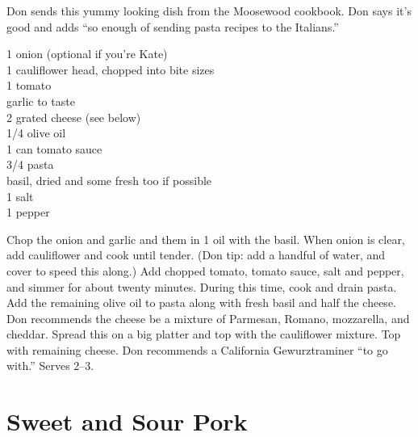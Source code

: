 \begin{open}
  Don sends this yummy looking dish from the Moosewood cookbook. Don
  says it's good and adds ``so enough of sending pasta recipes to the
  Italians.''
\end{open}
\begin{ingredients}
  1 onion (optional if you're Kate)\\
  1 cauliflower head, chopped into bite sizes\\
  1 tomato\\
  garlic to taste\\
  \SI{2}{\cup} grated cheese (see below)\\
  \SI{1/4}{\cup} olive oil\\
  1 can tomato sauce\\
  \SI{3/4}{\pound} pasta\\
  basil, dried and some fresh too if possible\\
  \SI{1}{\teaspoon} salt\\
  \SI{1}{\teaspoon} pepper
\end{ingredients}
Chop the onion and garlic and \saute them in \SI{1}{\teaspoon} oil with the
basil. When onion is clear, add cauliflower and cook until tender. (Don tip: add
a handful of water, and cover to speed this along.) Add chopped tomato, tomato
sauce, salt and pepper, and simmer for about twenty minutes. During this time,
cook and drain pasta. Add the remaining olive oil to pasta along with fresh
basil and half the cheese. Don recommends the cheese be a mixture of Parmesan,
Romano, mozzarella, and cheddar. Spread this on a big platter and top with the
cauliflower mixture. Top with remaining cheese. Don recommends a California
Gewurztraminer ``to go with.''  Serves \numrange{2}{3}.

\section{Sweet and Sour Pork}


